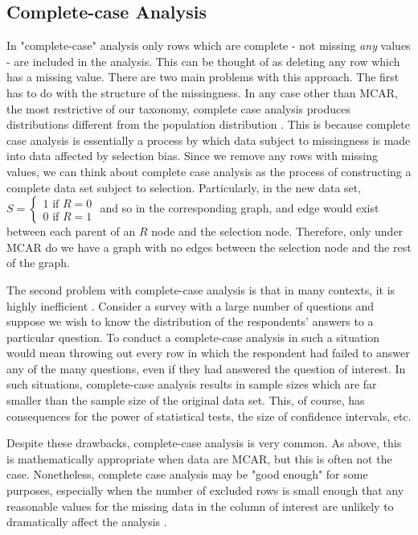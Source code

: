 \documentclass[12pt,twoside]{reedthesis}
\theoremstyle{definition}
\begin{document}
\subsection{Complete-case Analysis}
In "complete-case" analysis only rows which are complete - not missing \emph{any} values - are included in the analysis. This can be thought of as deleting any row which has a missing value. There are two main problems with this approach. The first has to do with the structure of the missingness. In any case other than MCAR, the most restrictive of our taxonomy, complete case analysis produces distributions different from the population distribution \citep{Little_1986}. This is because complete case analysis is essentially a process by which data subject to missingness is made into data affected by selection bias. Since we remove any rows with missing values, we can think about complete case analysis as the process of constructing a complete data set subject to selection. Particularly, in the new data set, $S= \begin{cases}1 \text{ if } R=0 \\ 0 \text{ if } R = 1 \end{cases}$ and so in the corresponding graph, and edge would exist between each parent of an $R$ node and the selection node. Therefore, only under MCAR do we have a graph with no edges between the selection node and the rest of the graph.

The second problem with complete-case analysis is that in many contexts, it is highly inefficient \citep{Little_1986}. Consider a survey with a large number of questions and suppose we wish to know the distribution of the respondents' answers to a particular question. To conduct a complete-case analysis in such a situation would mean throwing out every row in which the respondent had failed to answer any of the many questions, even if they had answered the question of interest. In such situations, complete-case analysis results in sample sizes which are far smaller than the sample size of the original data set. This, of course, has consequences for the power of statistical tests, the size of confidence intervals, etc. 

Despite these drawbacks, complete-case analysis is very common. As above, this is mathematically appropriate when data are MCAR, but this is often not the case. Nonetheless, complete case analysis may be "good enough" for some purposes, especially when the number of excluded rows is small enough that any reasonable values for the missing data in the column of interest are unlikely to dramatically affect the analysis \citep{Schafer_2002}.
\end{document}
